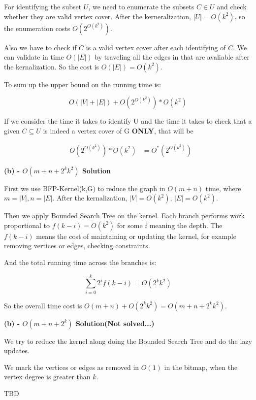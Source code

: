 \documentclass[12pt]{article}
\begin{document}
For identifying the subset $U$, we need to enumerate the subsets $C \in U$ and check whether they are valid vertex cover. After the kerneralization, $|U| = O(k^2)$, so the enumeration costs $O(2^{O(k^2)})$.

Also we have to check if $C$ is a valid vertex cover after each identifying of $C$. We can validate in time $O(|E|)$ by traveling all the edges in that are avaliable after the kernalization. So the cost is $O(|E|)=O(k^2)$.

To sum up the upper bound on the running time is:

\begin{equation}
O(|V| + |E|) + O(2^{O(k^2)}) * O(k^2)
\end{equation}

If we consider the time it takes to identify U and the time it takes to check that a given $C \subseteq U$ is indeed a vertex cover of G \textbf{ONLY}, that will be

\begin{equation}
\begin{aligned}
&O(2^{O(k^2)}) * O(k^2)
&=O^*(2^{O(k^2)}) 
\end{aligned}
\end{equation}


\textbf{(b) - $O(m+n+2^k k^2)$ Solution}


First we use BFP-Kernel(k,G) to reduce the graph in $O(m+n)$ time, where $m=|V|, n=|E|$. After the kernalization, $|V|=O(k^2)$, $|E|=O(k^2)$.

Then we apply Bounded Search Tree on the kernel. Each branch performs work proportional to $f(k-i)=O(k^2)$ for some $i$ meaning the depth. The $f(k-i)$ means the cost of maintaining or updating the kernel, for example removing vertices or edges, checking constraints.

And the total running time across the branches is:

\begin{equation}
\sum_{i=0}^{k} 2^i f(k-i) = O(2^k k^2)
\end{equation}

So the overall time cost is $O(m+n)+O(2^k k^2) = O(m+n+2^k k^2)$.

\textbf{(b) - $O(m+n+2^k)$ Solution(Not solved...)}

We try to reduce the kernel along doing the Bounded Search Tree and do the lazy updates.

We mark the vertices or edges as removed in $O(1)$ in the bitmap, when the vertex degree is greater than $k$.

TBD
\end{document}
